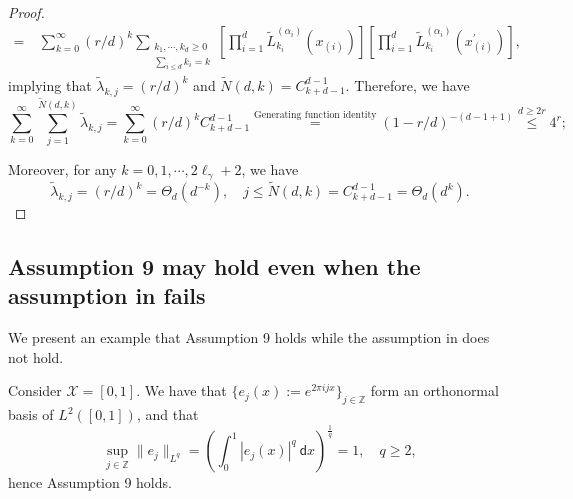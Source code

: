 \documentclass{article}
\theoremstyle{plain}
\theoremstyle{definition}
\theoremstyle{remark}
\newcommand{\calX}{\mathcal{X}}
\begin{document}
\begin{appendix}
\begin{proof}
\begin{equation*}
\begin{aligned}
        =&~
        \sum_{k=0}^{\infty} (r/d)^{k} \sum_{\substack{k_1, \cdots, k_d \geq 0 \\ \sum_{i \leq d} k_{i} = k}} \left[\prod_{i=1}^{d} \tilde{L}_{k_i}^{(\alpha_i)}(x_{(i)}) \right]
        \left[\prod_{i=1}^{d} \tilde{L}_{k_i}^{(\alpha_i)}(x_{(i)}^{\prime}) \right],
    \end{aligned}
\end{equation*}
implying that $\tilde{\lambda}_{k, j} = (r/d)^{k}$ and $\tilde{N}(d, k) = C_{k+d-1}^{d-1}$. Therefore, we have
    $$
    \sum_{k=0}^{\infty} \sum_{j=1}^{\tilde{N}(d, k)} \tilde{\lambda}_{k, j} = \sum_{k=0}^{\infty} (r/d)^{k} C_{k+d-1}^{d-1} \overset{\text{Generating function identity}}{=} (1-r/d)^{-(d-1+1)} \overset{d \geq 2r}{\leq} 4^r;
    $$


    Moreover, for any $k  = 0, 1, \cdots, 2\ell_{\gamma} +2$, we have 
    $$
        \tilde{\lambda}_{k, j} = (r/d)^{k}= \Theta_d(d^{-k}), \quad j \leq \tilde{N}(d, k) = C_{k+d-1}^{d-1} = \Theta_d(d^{k}).
    $$
\end{proof}











\subsection{Assumption 9 may hold even when the assumption in \cite{misiakiewicz2024non} fails}\label{appendix_counter_mis}

We present an example that Assumption 9 holds while the assumption in \cite{misiakiewicz2024non} does not hold. 

Consider $\calX=[0, 1]$. We have that $\{e_j(x):=e^{2\pi i j x}\}_{j \in \mathbb{Z}}$ form an orthonormal basis of $L^2([0, 1])$, and that
$$
\sup_{j \in \mathbb{Z}} \|e_j\|_{L^{q}} = \left(\int_0^{1} |e_j(x)|^q ~ \mathsf{d} x \right)^{\frac{1}{q}} = 1, \quad q \geq 2,
$$
hence Assumption 9 holds.


\end{appendix}
\end{document}
